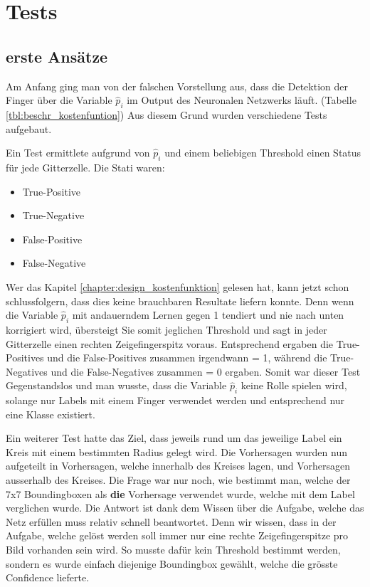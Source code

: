 \newpage
\section{Tests} 
\label{chapter:tests}
\subsection{erste Ansätze}
Am Anfang ging man von der falschen Vorstellung aus, dass die Detektion der Finger über die Variable $\hat{p}_i$ im Output des Neuronalen Netzwerks läuft. (Tabelle \ref{tbl:beschr_kostenfuntion})
Aus diesem Grund wurden verschiedene Tests aufgebaut.

Ein Test ermittlete aufgrund von $\hat{p}_i$ und einem beliebigen Threshold einen Status für jede Gitterzelle. Die Stati waren: 

\begin{itemize}
\item \grqq{}True-Positive\grqq{}
\item \grqq{}True-Negative\grqq{}
\item \grqq{}False-Positive\grqq{}
\item \grqq{}False-Negative\grqq{}
\end{itemize}

Wer das Kapitel \ref{chapter:design_kostenfunktion} gelesen hat, kann jetzt schon schlussfolgern, dass dies keine brauchbaren Resultate liefern konnte.
Denn wenn die Variable $\hat{p}_i$ mit andauerndem Lernen gegen 1 tendiert und nie nach unten korrigiert wird, übersteigt Sie somit jeglichen Threshold und sagt in jeder Gitterzelle einen rechten Zeigefingerspitz voraus. 
Entsprechend ergaben die \grqq{}True-Positives\grqq{} und die \grqq{}False-Positives\grqq{} zusammen irgendwann = 1, während die \grqq{}True-Negatives\grqq{} und die \grqq{}False-Negatives\grqq{} zusammen = 0 ergaben.
Somit war dieser Test Gegenstandslos und man wusste, dass die Variable $\hat{p}_i$ keine Rolle spielen wird, solange nur Labels mit einem Finger verwendet werden und entsprechend nur eine Klasse existiert.

Ein weiterer Test hatte das Ziel, dass jeweils rund um das jeweilige Label ein Kreis mit einem bestimmten Radius gelegt wird.
Die Vorhersagen wurden nun aufgeteilt in Vorhersagen, welche innerhalb des Kreises lagen, und Vorhersagen ausserhalb des Kreises.
Die Frage war nur noch, wie bestimmt man, welche der 7x7 Boundingboxen als \textbf{die} Vorhersage verwendet wurde, welche mit dem Label verglichen wurde.
Die Antwort ist dank dem Wissen über die Aufgabe, welche das Netz erfüllen muss relativ schnell beantwortet.
Denn wir wissen, dass in der Aufgabe, welche gelöst werden soll immer nur eine rechte Zeigefingerspitze pro Bild vorhanden sein wird.
So musste dafür kein Threshold bestimmt werden, sondern es wurde einfach diejenige Boundingbox gewählt, welche die grösste Confidence lieferte.

